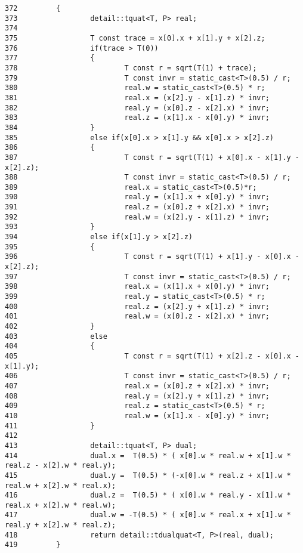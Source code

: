 \begin{Code}\begin{verbatim}372         {
373                 detail::tquat<T, P> real;
374                 
375                 T const trace = x[0].x + x[1].y + x[2].z;
376                 if(trace > T(0))
377                 {
378                         T const r = sqrt(T(1) + trace);
379                         T const invr = static_cast<T>(0.5) / r;
380                         real.w = static_cast<T>(0.5) * r;
381                         real.x = (x[2].y - x[1].z) * invr;
382                         real.y = (x[0].z - x[2].x) * invr;
383                         real.z = (x[1].x - x[0].y) * invr;
384                 }
385                 else if(x[0].x > x[1].y && x[0].x > x[2].z)
386                 {
387                         T const r = sqrt(T(1) + x[0].x - x[1].y - x[2].z);
388                         T const invr = static_cast<T>(0.5) / r;
389                         real.x = static_cast<T>(0.5)*r;
390                         real.y = (x[1].x + x[0].y) * invr;
391                         real.z = (x[0].z + x[2].x) * invr;
392                         real.w = (x[2].y - x[1].z) * invr;
393                 }
394                 else if(x[1].y > x[2].z)
395                 {
396                         T const r = sqrt(T(1) + x[1].y - x[0].x - x[2].z);
397                         T const invr = static_cast<T>(0.5) / r;
398                         real.x = (x[1].x + x[0].y) * invr;
399                         real.y = static_cast<T>(0.5) * r;
400                         real.z = (x[2].y + x[1].z) * invr;
401                         real.w = (x[0].z - x[2].x) * invr;
402                 }
403                 else
404                 {
405                         T const r = sqrt(T(1) + x[2].z - x[0].x - x[1].y);
406                         T const invr = static_cast<T>(0.5) / r;
407                         real.x = (x[0].z + x[2].x) * invr;
408                         real.y = (x[2].y + x[1].z) * invr;
409                         real.z = static_cast<T>(0.5) * r;
410                         real.w = (x[1].x - x[0].y) * invr;
411                 }
412                 
413                 detail::tquat<T, P> dual;
414                 dual.x =  T(0.5) * ( x[0].w * real.w + x[1].w * real.z - x[2].w * real.y);
415                 dual.y =  T(0.5) * (-x[0].w * real.z + x[1].w * real.w + x[2].w * real.x);
416                 dual.z =  T(0.5) * ( x[0].w * real.y - x[1].w * real.x + x[2].w * real.w);
417                 dual.w = -T(0.5) * ( x[0].w * real.x + x[1].w * real.y + x[2].w * real.z);
418                 return detail::tdualquat<T, P>(real, dual);
419         }
\end{verbatim}
\end{Code}




